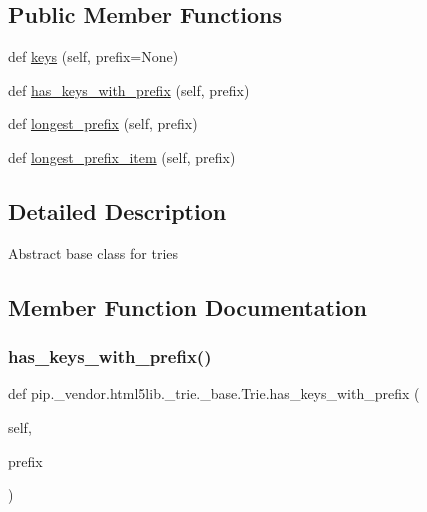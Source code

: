 \subsection*{Public Member Functions}
\begin{DoxyCompactItemize}
\item 
def \hyperlink{classpip_1_1__vendor_1_1html5lib_1_1__trie_1_1__base_1_1Trie_a025179c708e9d68d03538b6b1eb57210}{keys} (self, prefix=None)
\item 
def \hyperlink{classpip_1_1__vendor_1_1html5lib_1_1__trie_1_1__base_1_1Trie_ae9c2359ca607b05a8b969f07ca7df667}{has\+\_\+keys\+\_\+with\+\_\+prefix} (self, prefix)
\item 
def \hyperlink{classpip_1_1__vendor_1_1html5lib_1_1__trie_1_1__base_1_1Trie_a77a35df152c954eaaa2e07f46821bd3e}{longest\+\_\+prefix} (self, prefix)
\item 
def \hyperlink{classpip_1_1__vendor_1_1html5lib_1_1__trie_1_1__base_1_1Trie_abfe437b5d4f907dd4abc471cb70adcfa}{longest\+\_\+prefix\+\_\+item} (self, prefix)
\end{DoxyCompactItemize}


\subsection{Detailed Description}
\begin{DoxyVerb}Abstract base class for tries\end{DoxyVerb}
 

\subsection{Member Function Documentation}
\mbox{\label{classpip_1_1__vendor_1_1html5lib_1_1__trie_1_1__base_1_1Trie_ae9c2359ca607b05a8b969f07ca7df667}} 
\subsubsection{\texorpdfstring{has\+\_\+keys\+\_\+with\+\_\+prefix()}{has\_keys\_with\_prefix()}}
{\footnotesize\ttfamily def pip.\+\_\+vendor.\+html5lib.\+\_\+trie.\+\_\+base.\+Trie.\+has\+\_\+keys\+\_\+with\+\_\+prefix (\begin{DoxyParamCaption}\item[{}]{self,  }\item[{}]{prefix }\end{DoxyParamCaption})}

